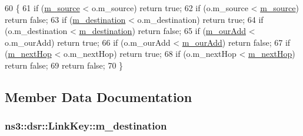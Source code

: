\begin{DoxyCode}
60   \{
61       \textcolor{keywordflow}{if} (\hyperlink{structns3_1_1dsr_1_1LinkKey_a522ac967540e9db2425ca20c43e30f45}{m\_source} < o.m\_source) \textcolor{keywordflow}{return} \textcolor{keyword}{true};
62       \textcolor{keywordflow}{if} (o.m\_source < \hyperlink{structns3_1_1dsr_1_1LinkKey_a522ac967540e9db2425ca20c43e30f45}{m\_source}) \textcolor{keywordflow}{return} \textcolor{keyword}{false};
63       \textcolor{keywordflow}{if} (\hyperlink{structns3_1_1dsr_1_1LinkKey_ae2c9c019b9faafceb5b840fc91c13673}{m\_destination} < o.m\_destination) \textcolor{keywordflow}{return} \textcolor{keyword}{true};
64       \textcolor{keywordflow}{if} (o.m\_destination < \hyperlink{structns3_1_1dsr_1_1LinkKey_ae2c9c019b9faafceb5b840fc91c13673}{m\_destination}) \textcolor{keywordflow}{return} \textcolor{keyword}{false};
65       \textcolor{keywordflow}{if} (\hyperlink{structns3_1_1dsr_1_1LinkKey_a7d986790dade52e799e34ba79af2aa96}{m\_ourAdd} < o.m\_ourAdd) \textcolor{keywordflow}{return} \textcolor{keyword}{true};
66       \textcolor{keywordflow}{if} (o.m\_ourAdd < \hyperlink{structns3_1_1dsr_1_1LinkKey_a7d986790dade52e799e34ba79af2aa96}{m\_ourAdd}) \textcolor{keywordflow}{return} \textcolor{keyword}{false};
67       \textcolor{keywordflow}{if} (\hyperlink{structns3_1_1dsr_1_1LinkKey_afd2217721c7442503ebf6d708c1ca00a}{m\_nextHop} < o.m\_nextHop) \textcolor{keywordflow}{return} \textcolor{keyword}{true};
68       \textcolor{keywordflow}{if} (o.m\_nextHop < \hyperlink{structns3_1_1dsr_1_1LinkKey_afd2217721c7442503ebf6d708c1ca00a}{m\_nextHop}) \textcolor{keywordflow}{return} \textcolor{keyword}{false};
69       \textcolor{keywordflow}{return} \textcolor{keyword}{false};
70   \}
\end{DoxyCode}


\subsection{Member Data Documentation}
\subsubsection[{\texorpdfstring{m\+\_\+destination}{m_destination}}]{ ns3\+::dsr\+::\+Link\+Key\+::m\+\_\+destination}\hypertarget{structns3_1_1dsr_1_1LinkKey_ae2c9c019b9faafceb5b840fc91c13673}{}\label{structns3_1_1dsr_1_1LinkKey_ae2c9c019b9faafceb5b840fc91c13673}

